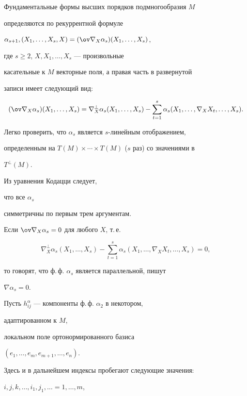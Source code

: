 Фундаментальные формы высших порядков подмногообразия $M$


определяются по рекуррентной формуле


$\alpha_{s+1},(X_1,\dotsc,X_s,X)=(\ov\nabla_X\alpha_s)(X_1,\dotsc,X_s)$,


где $s\ge 2$, $X,X_1,\dotsc,X_s$ --- произвольные


касательные к $M$ векторные поля, а правая часть в развернутой


записи имеет следующий вид:


$$


(\ov\nabla_X\alpha_s)(X_1,\dotsc,X_s)=


\nabla^\bot_X\alpha_s(X_1,\dotsc,X_s)-


\sum^s_{t=1}\alpha_s(X_1,\dotsc,\nabla_X X_t,\dotsc,X_s).


$$


Легко проверить, что $\alpha_s$ является $s$-линейным отображением,


определенным на $T(M)\times\dotsb\times T(M)$ ($s$ раз) со значениями в


$T^\bot(M)$.


Из уравнения Кодацци следует,


что все $\alpha_s$


симметричны по первым трем аргументам.





Если $\ov\nabla_X\alpha_s=0$ для любого $X$, т.\,е.


$$


\nabla^\bot_X\alpha_s(X_1,\dotsc,X_s)-\sum^s_{t=1}\alpha_s


(X_1,\dotsc,\nabla_X X_t,\dotsc, X_s)=0,


$$


то говорят, что ф.\,ф. $\alpha_s$ является параллельной, пишут


$\nabla\alpha_s=0$.





Пусть $h^\alpha_{ij}$ --- компоненты ф.\,ф. $\alpha_2$ в некотором,


адаптированном к $M$,


локальном поле ортонормированного базиса


$(e_1,\dotsc,e_m,e_{m+1},\dotsc,e_n)$.


Здесь и в дальнейшем индексы пробегают следующие значения:


$i,j,k,\dotsc,i_1,j_1,\dotsc=1,\dotsc,m$,


